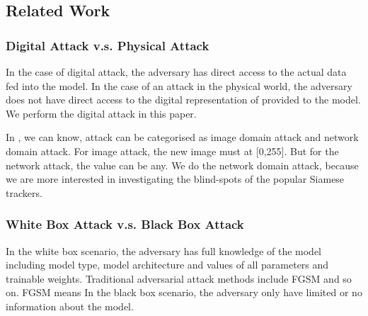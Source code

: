 \documentclass{article}
\begin{document}
\subsection{Related Work}

\subsubsection{Digital Attack v.s. Physical Attack}

In the case of digital attack, the adversary has direct access to the actual data fed into the model. In the case of an attack in the physical world, the adversary does not have direct access to the digital representation of provided to the model. We perform the digital attack in this paper.

In \cite{karmon2018lavan}, we can know, attack can be categorised as image domain attack and network domain attack. For image attack, the new image must at [0,255]. But for the network attack, the value can be any. We do the network domain attack, because we are more interested in investigating the blind-spots of the popular Siamese trackers.

\subsubsection{White Box Attack v.s. Black Box Attack}

In the white box scenario, the adversary has full knowledge of the model including model type, model architecture and values of all parameters and trainable weights.
Traditional adversarial attack methods include FGSM \cite{FGSM} and so on. FGSM means In the black box scenario, the adversary only have limited or no information about the model.
\end{document}

